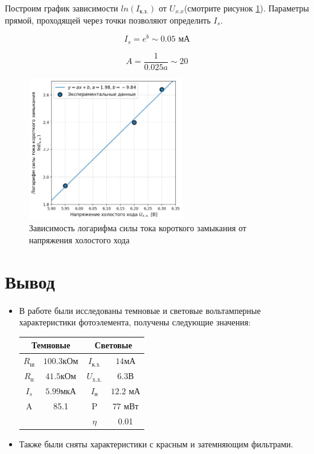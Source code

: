 \documentclass[a4paper, 12pt]{extarticle}
\begin{document}
Построим график зависимости $ln(I_{\text{к.з.}})$ от $U_{x.x}$(смотрите рисунок \ref{fig:line}). Параметры прямой, проходящей через точки позволяют определить $I_s$.

\begin{equation}
    I_{s} = e^{b} \sim 0.05 \text{ мА}
\end{equation}

\begin{equation}
    A = \frac{1}{0.025 a} \sim 20
\end{equation}


\begin{figure}[htbp]
    \centering
    \includegraphics[width = 0.6\textwidth]{pics/line.png}
    \caption{Зависимость логарифма силы тока короткого замыкания от напряжения холостого хода}
    \label{fig:line}
\end{figure}

\newpage
\section*{\textcolor{header}{Вывод}}

\begin{itemize}
    \item В работе были исследованы темновые и световые вольтамперные характеристики фотоэлемента, получены следующие значения:
   
   \begin{table}[hbtp]
   \centering 
   \begin{tabular}{cc|cc}
   \multicolumn{2}{c|}{Темновые} & \multicolumn{2}{c}{Световые} \\ \hline
   $R_\text{ш}$ & $100.3 \text{кОм}$ & $I_{\text{к.з.}}$ & $14 \text{мА}$ \\
   $R_\text{п}$ & $41.5 \text{кОм}$ & $U_{\text{x.x.}}$ & $6.3 \text{В}$ \\
   $I_s$ & $5.99 \text{мкА}$ & $I_{\text{н}}$ & $12.2 \text{ мА}$ \\
   A & 85.1 & P & $77 \text{ мВт}$ \\
    & & $\eta$ & 0.01 
   \end{tabular}
   \end{table}
   
    \item Также были сняты характеристики с красным и затемняющим фильтрами.
   
   \end{itemize}
\end{document}
